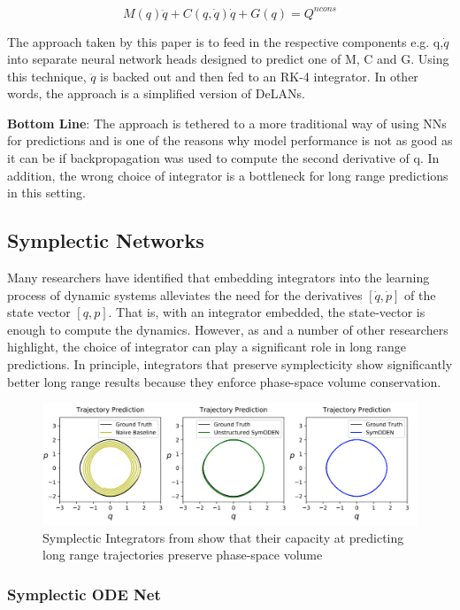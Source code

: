 \documentclass{article}
\begin{document}
$$ M(q) \ddot{q} + C(q,\dot{q})\dot{q} + G(q) = Q^{ncons} $$

The approach taken by this paper is to feed in the respective components e.g. q,$\dot{q}$ into separate neural network heads designed to predict one of M, C and G. Using this technique, $\ddot{q}$ is backed out and then fed to an RK-4 integrator. In other words, the approach is a simplified version of DeLANs.

\textbf{Bottom Line}: The approach is tethered to a more traditional way of using NNs for predictions and is one of the reasons why model performance is not as good as it can be if backpropagation was used to compute the second derivative of q. In addition, the wrong choice of integrator is a bottleneck for long range predictions in this setting.

\subsection{Symplectic Networks}

Many researchers have identified that embedding integrators into the learning process of dynamic systems alleviates the need for the derivatives $[\dot{q},\dot{p}]$ of the state vector $[q,p]$. That is, with an integrator embedded, the state-vector is enough to compute the dynamics. However, as \cite{zhu_deep_2020} and a number of other researchers highlight, the choice of integrator can play a significant role in long range predictions. In principle, integrators that preserve symplecticity show significantly better long range results because they enforce phase-space volume conservation.

\begin{figure}
\centering
\includegraphics[width=\textwidth]{figures/4sympnet.png}
\caption{Symplectic Integrators from \cite{zhong_symplectic_2019} show that their capacity at predicting long range trajectories preserve phase-space volume}
\end{figure}

\subsubsection{Symplectic ODE Net}
\end{document}

